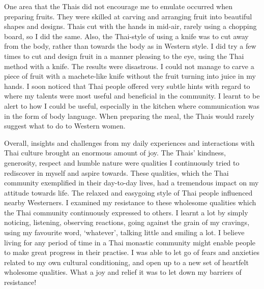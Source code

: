One area that the Thais did not encourage me to emulate occurred when
preparing fruits. They were skilled at carving and arranging fruit into
beautiful shapes and designs. Thais cut with the hands in mid-air, 
rarely using a chopping board, so I did the same. Also, the Thai-style
of using a knife was to cut away from the body, rather than towards the
body as in Western style. I did try a few times to cut and design fruit
in a manner pleasing to the eye, using the Thai method with a knife. The
results were disastrous. I could not manage to carve a piece of fruit
with a machete-like knife without the fruit turning into juice in my
hands. I soon noticed that Thai people offered very subtle hints with
regard to where my talents were most useful and beneficial in the
community. I learnt to be alert to how I could be useful, especially in
the kitchen where communication was in the form of body language. When
preparing the meal, the Thais would rarely suggest what to do to Western
women. 

Overall, insights and challenges from my daily experiences and
interactions with Thai culture brought an enormous amount of joy. The
Thais' kindness, generosity, respect and humble nature were qualities I
continuously tried to rediscover in myself and aspire towards. These
qualities, which the Thai community exemplified in their day-to-day
lives, had a tremendous impact on my attitude towards life. The relaxed
and easygoing style of Thai people influenced nearby Westerners. I
examined my resistance to these wholesome qualities which the Thai
community continuously expressed to others. I learnt a lot by simply
noticing, listening, observing reactions, going against the grain of my
cravings, using my favourite word, `whatever', talking little and
smiling a lot. I believe living for any period of time in a Thai
monastic community might enable people to make great progress in their
practise. I was able to let go of fears and anxieties related to my own
cultural conditioning, and open up to a new set of heartfelt wholesome
qualities. What a joy and relief it was to let down my barriers of
resistance! 

